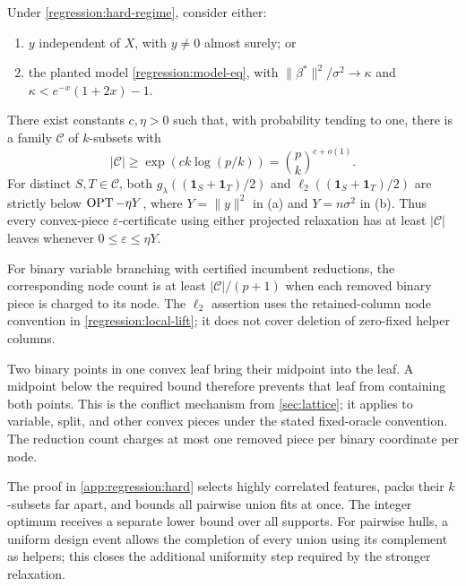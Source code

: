 \begin{theorem}
\label{regression:hard-theorem}
Under \eqref{regression:hard-regime}, consider either:
\begin{enumerate}[label=(\alph*)]
\item $y$ independent of $X$, with $y\ne0$ almost surely; or
\item the planted model \eqref{regression:model-eq}, with
      $\|\beta^*\|^2/\sigma^2\to\kappa$ and
      $\kappa<e^{-x}(1+2x)-1$.
\end{enumerate}
There exist constants $c,\eta>0$ such that, with probability tending
to one, there is a family $\mathcal C$ of $k$-subsets with
\begin{equation}\label{regression:clique-size}
 |\mathcal C|\geq\exp(c k\log(p/k))=\binom pk^{c+o(1)}.
\end{equation}
For distinct $S,T\in\mathcal C$, both
$g_\lambda((\mathbf1_S+\mathbf1_T)/2)$ and
$\ell_2((\mathbf1_S+\mathbf1_T)/2)$ are strictly below
$\operatorname{OPT}-\eta Y$, where $Y=\|y\|^2$ in (a) and $Y=n\sigma^2$ in (b).
Thus every convex-piece $\varepsilon$-certificate using either
projected relaxation has at least $|\mathcal C|$ leaves whenever
$0\leq\varepsilon\leq\eta Y$.

For binary variable branching with certified incumbent reductions,
the corresponding node count is at least $|\mathcal C|/(p+1)$ when
each removed binary piece is charged to its node. The $\ell_2$ assertion
uses the retained-column node convention in
\eqref{regression:local-lift}; it does not cover deletion of zero-fixed
helper columns.
\end{theorem}

Two binary points in one convex leaf bring their midpoint into the
leaf. A midpoint below the required bound therefore prevents that
leaf from containing both points. This is the conflict mechanism from
\cref{sec:lattice}; it applies to variable, split, and other convex
pieces under the stated fixed-oracle convention. The reduction count
charges at most one removed piece per binary coordinate per node.

The proof in \cref{app:regression:hard} selects highly correlated
features, packs their $k$-subsets far apart, and bounds all pairwise
union fits at once. The integer optimum receives a separate lower
bound over all supports. For pairwise hulls, a uniform design event
allows the completion of every union using its complement as helpers;
this closes the additional uniformity step required by the stronger
relaxation.

